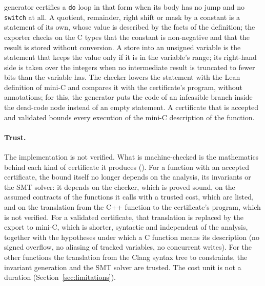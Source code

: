 \documentclass[oneside,english]{amsart}
\numberwithin{equation}{section}
\numberwithin{figure}{section}
\theoremstyle{plain}
\theoremstyle{definition}
\theoremstyle{plain}
\theoremstyle{remark}
\theoremstyle{plain}
\theoremstyle{definition}
\theoremstyle{plain}
\theoremstyle{remark}
\begin{document}
generator certifies a \texttt{do} loop in that form when its body has no jump and no \texttt{switch} at all. A quotient, remainder, right shift or mask by a constant is a statement of its own, whose value is described by the facts of the definition; the exporter checks on the C types that the constant is non-negative and that the result is stored without conversion. A store into an unsigned variable is the statement that keeps the value only if it is in the variable's range; its right-hand side is taken over the integers when no intermediate result is truncated to fewer bits than the variable has. The checker lowers the statement with the Lean definition of mini-C and compares it with the certificate's program, without annotations; for this, the generator puts the code of an infeasible branch inside the dead-code node instead of an empty statement. A certificate that is accepted and validated bounds every execution of the mini-C description of the function.

\paragraph{Trust.}
The implementation is not verified. What is machine-checked is the mathematics behind each kind of certificate it produces (\cite[Section~\ref{I-sec:mechanization}]{crosscheckTheory}). For a function with an accepted certificate, the bound itself no longer depends on the analysis, its invariants or the SMT solver: it depends on the checker, which is proved sound, on the assumed contracts of the functions it calls with a trusted cost, which are listed, and on the translation from the C++ function to the certificate's program, which is not verified. For a validated certificate, that translation is replaced by the export to mini-C, which is shorter, syntactic and independent of the analysis, together with the hypotheses under which a C function means its description (no signed overflow, no aliasing of tracked variables, no concurrent writes). For the other functions the translation from the Clang syntax tree to constraints, the invariant generation and the SMT solver are trusted. The cost unit is not a duration (Section~\ref{sec:limitations}).
\end{document}
